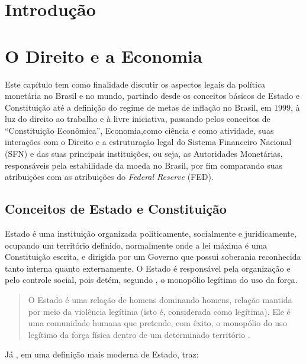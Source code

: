 \documentclass[]{article}
\title{}
\author{}
\date{}
\begin{document}
{
\setcounter{tocdepth}{2}
\tableofcontents
}
\section*{Introdução}\label{introducao}

\section{O Direito e a Economia}\label{cap:1}

Este capítulo tem como finalidade discutir os aspectos legais da
política monetária no Brasil e no mundo, partindo desde os conceitos
básicos de Estado e Constituição até a definição do regime de metas de
inflação no Brasil, em 1999, à luz do direito ao trabalho e à livre
iniciativa, passando pelos conceitos de ``Constituição Econômica'',
Economia,como ciência e como atividade, suas interações com o Direito e
a estruturação legal do Sistema Financeiro Nacional (SFN) e das suas
principais instituições, ou seja, as Autoridades Monetárias,
responsáveis pela estabilidade da moeda no Brasil, por fim comparando
suas atribuições com as atribuições do \emph{Federal Reserve} (FED).

\subsection{Conceitos de Estado e
Constituição}\label{conceitos-de-estado-e-constituicao}

Estado é uma instituição organizada politicamente, socialmente e
juridicamente, ocupando um território definido, normalmente onde a lei
máxima é uma Constituição escrita, e dirigida por um Governo que possui
soberania reconhecida tanto interna quanto externamente. O Estado é
responsável pela organização e pelo controle social, pois detém, segundo
, o monopólio legítimo do uso da força.

\begin{quote}
O Estado é uma relação de homens dominando homens, relação mantida por
meio da violência legítima (isto é, considerada como legítima). Ele é
uma comunidade humana que pretende, com êxito, o monopólio do uso
legítimo da força física dentro de um determinado território
\cite{weber}.
\end{quote}

Já , em uma definição mais
moderna de Estado, traz:
\end{document}
